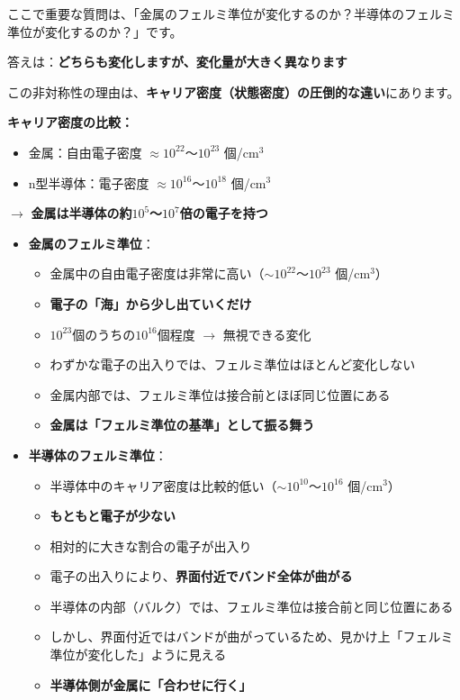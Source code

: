 ここで重要な質問は、「金属のフェルミ準位が変化するのか？半導体のフェルミ準位が変化するのか？」です。

答えは：\textbf{どちらも変化しますが、変化量が大きく異なります}

この非対称性の理由は、\textbf{キャリア密度（状態密度）の圧倒的な違い}にあります。

\begin{screen}
\textbf{キャリア密度の比較：}
\begin{itemize}
\item 金属：自由電子密度 $\approx 10^{22}$〜$10^{23}$ 個/cm$^3$
\item n型半導体：電子密度 $\approx 10^{16}$〜$10^{18}$ 個/cm$^3$
\end{itemize}
$\rightarrow$ \textbf{金属は半導体の約$10^5$〜$10^7$倍の電子を持つ}
\end{screen}

\begin{itemize}
\item \textbf{金属のフェルミ準位}：
\begin{itemize}
\item 金属中の自由電子密度は非常に高い（$\sim 10^{22}$〜$10^{23}$ 個/cm$^3$）
\item \textbf{電子の「海」から少し出ていくだけ}
\item $10^{23}$個のうちの$10^{16}$個程度 $\rightarrow$ 無視できる変化
\item わずかな電子の出入りでは、フェルミ準位はほとんど変化しない
\item 金属内部では、フェルミ準位は接合前とほぼ同じ位置にある
\item \textbf{金属は「フェルミ準位の基準」として振る舞う}
\end{itemize}

\item \textbf{半導体のフェルミ準位}：
\begin{itemize}
\item 半導体中のキャリア密度は比較的低い（$\sim 10^{10}$〜$10^{16}$ 個/cm$^3$）
\item \textbf{もともと電子が少ない}
\item 相対的に大きな割合の電子が出入り
\item 電子の出入りにより、\textbf{界面付近でバンド全体が曲がる}
\item 半導体の内部（バルク）では、フェルミ準位は接合前と同じ位置にある
\item しかし、界面付近ではバンドが曲がっているため、見かけ上「フェルミ準位が変化した」ように見える
\item \textbf{半導体側が金属に「合わせに行く」}
\end{itemize}
\end{itemize}

